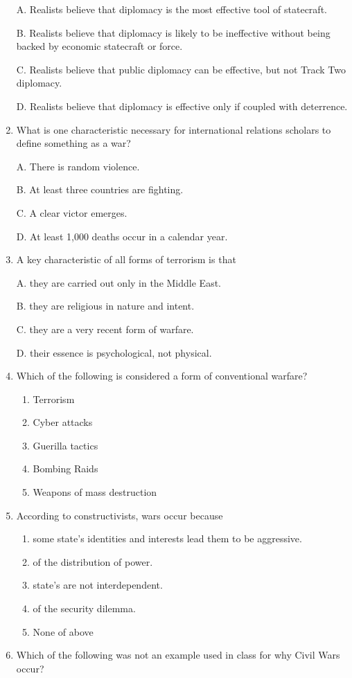 \documentclass[
]{book}
\begin{document}
\begin{enumerate}
  A. Realists believe that diplomacy is the most effective tool of statecraft.

  B. Realists believe that diplomacy is likely to be ineffective without being backed by economic statecraft or force.

  C. Realists believe that public diplomacy can be effective, but not Track Two diplomacy.

  D. Realists believe that diplomacy is effective only if coupled with deterrence.
\item
  What is one characteristic necessary for international relations scholars to define something as a war?

  A. There is random violence.

  B. At least three countries are fighting.

  C. A clear victor emerges.

  D. At least 1,000 deaths occur in a calendar year.
\item
  A key characteristic of all forms of terrorism is that

  A. they are carried out only in the Middle East.

  B. they are religious in nature and intent.

  C. they are a very recent form of warfare.

  D. their essence is psychological, not physical.
\item
  Which of the following is considered a form of conventional warfare?

  \begin{enumerate}
  \def\labelenumii{\Alph{enumii}.}
  \item
    Terrorism
  \item
    Cyber attacks
  \item
    Guerilla tactics
  \item
    Bombing Raids
  \item
    Weapons of mass destruction
  \end{enumerate}
\item
  According to constructivists, wars occur because

  \begin{enumerate}
  \def\labelenumii{\Alph{enumii}.}
  \item
    some state's identities and interests lead them to be aggressive.
  \item
    of the distribution of power.
  \item
    state's are not interdependent.
  \item
    of the security dilemma.
  \item
    None of above
  \end{enumerate}
\item
  Which of the following was not an example used in class for why Civil Wars occur?


\end{enumerate}
\end{document}
